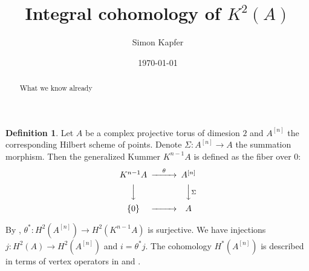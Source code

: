 \documentclass{amsart}
\newcommand{\hilb}[1]{^{[#1]}}
\theoremstyle{plain}
\theoremstyle{definition}
\newtheorem{definition}[theorem]{Definition}
\theoremstyle{remark}
\begin{document}
\title{Integral cohomology of $K^2(A)$}


\author{Simon Kapfer}
\address{Simon Kapfer, Laboratoire de Math\'ematiques et Applications, UMR CNRS 6086, Universit\'e de Poitiers, T\'el\'eport 2, Boulevard Marie et Pierre Curie, F-86962 Futuroscope Chasseneuil}


\date{\today}


\begin{abstract} 
What we know already
\end{abstract}

\maketitle

\begin{definition}
Let $A$ be a complex projective torus of dimesion $2$ and $A\hilb{n}$ the corresponding Hilbert scheme of points. Denote $\Sigma : A\hilb{n} \rightarrow A$ the summation morphism. Then the generalized Kummer $K^{n-1} A $ is defined as the fiber over $0$:
\begin{equation*}
\begin{CD}
K^{n-1}A @>\theta >> A\hilb{n}\\
@VVV @VV\Sigma V\\
\{0\} @> >> A
\end{CD}
\end{equation*}
\end{definition}
By \cite{Beauville}, $\theta^{\ast} : H^2(A\hilb{n}) \rightarrow H^2(K^{n-1}A)$ is surjective. We have injections $j : H^2(A)\rightarrow H^2(A\hilb{n})$ and $i = \theta^* j$. The cohomology $H^*(A\hilb{n})$ is described in terms of vertex operators in \cite{LehnSorger} and \cite{LiQinWang}.
\end{document}
